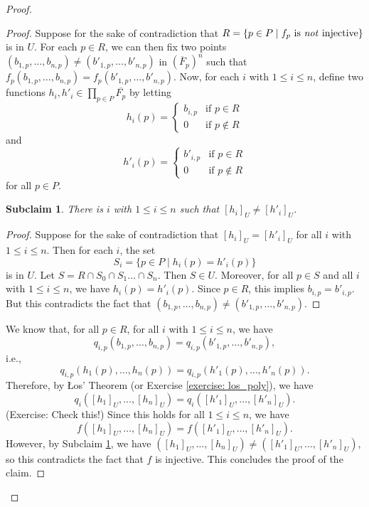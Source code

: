 \documentclass[a4paper]{memoir}
\newtheorem{subclaim}[theorem]{Subclaim}
\theoremstyle{definition}
\begin{document}
\begin{proof}
  \begin{proof}
    Suppose for the sake of contradiction that $R = \{p \in P \mid f_p \text{ is \emph{not} injective}\}$ 
    is in $U$. For each $p \in R$, we can then fix two points $(b_{1,p}, \ldots, b_{n,p}) \neq 
    (b'_{1,p}, \ldots, b'_{n,p})$ in $(\overline{F}_p)^n$ such that 
    $f_p(b_{1,p}, \ldots, b_{n,p}) = f_p(b'_{1,p}, \ldots, b'_{n,p})$. Now, for each $i$ with 
    $1 \leq i \leq n$, define two functions $h_i,h'_i \in \prod_{p \in P} \overline{F_p}$ by letting 
    \[
      h_i(p) = \begin{cases}
        b_{i,p} & \text{if } p \in R \\ 
        0 & \text{if } p \notin R
      \end{cases}
    \]
    and
    \[
      h'_i(p) = \begin{cases}
        b'_{i,p} & \text{if } p \in R \\ 
        0 & \text{if } p \notin R
      \end{cases}
    \]
    for all $p \in P$. 
    
    \begin{subclaim} \label{subclaim: distinction}
      There is $i$ with $1 \leq i \leq n$ such that $[h_i]_U \neq [h'_i]_U$.
    \end{subclaim}    
    
    \begin{proof}
      Suppose for the sake of contradiction that $[h_i]_U = [h'_i]_U$ for all 
      $i$ with $1 \leq i \leq n$. Then for each $i$, the set
      \[
        S_i = \{p \in P \mid h_i(p) = h'_i(p)\}
      \]
      is in $U$. Let $S = R \cap S_0 \cap S_1 \ldots \cap S_n$. Then $S \in U$. Moreover, for 
      all $p \in S$ and all $i$ with $1 \leq i \leq n$, we have $h_i(p) = h'_i(p)$. Since 
      $p \in R$, this implies $b_{i,p} = b'_{i,p}$. But this contradicts the fact that 
      $(b_{1,p}, \ldots, b_{n,p}) \neq (b'_{1,p}, \ldots, b'_{n,p})$.
    \end{proof}
    
    We know that, for all $p \in R$, for all $i$ with $1 \leq i \leq n$, we have 
    \[
      q_{i,p}(b_{1,p}, \ldots, b_{n,p}) = q_{i,p}(b'_{1,p}, \ldots, b'_{n,p}),
    \]
    i.e.,
    \[
      q_{i,p}(h_1(p), \ldots, h_n(p)) = q_{i,p}(h'_1(p), \ldots, h'_n(p)).
    \]
    Therefore, by \L os' Theorem (or Exercise \ref{exercise: los_poly}), we have
    \[
      q_i([h_1]_U, \ldots, [h_n]_U) = q_i([h'_1]_U, \ldots, [h'_n]_U).
    \]
    (Exercise: Check this!) Since this holds for all $1 \leq i \leq n$, we have
    \[
      f([h_1]_U, \ldots, [h_n]_U) = f([h'_1]_U, \ldots, [h'_n]_U).
    \]
    However, by Subclaim \ref{subclaim: distinction}, we have 
    $([h_1]_U, \ldots, [h_n]_U) \neq ([h'_1]_U, \ldots, [h'_n]_U)$, so this contradicts the 
    fact that $f$ is injective. This concludes the proof of the claim.
  \end{proof}
  

\end{proof}
\end{document}
